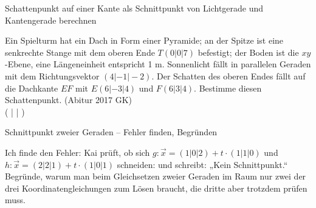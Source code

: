 \begin{aufgabe}{Schattenpunkt auf einer Kante als Schnittpunkt von Lichtgerade und Kantengerade berechnen}
\begin{teile}
\teil Ein Spielturm hat ein Dach in Form einer Pyramide; an der Spitze ist eine senkrechte Stange mit dem oberen Ende $T(0|0|7)$ befestigt; der Boden ist die $xy$-Ebene, eine Längeneinheit entspricht 1 m. Sonnenlicht fällt in parallelen Geraden mit dem Richtungsvektor $(4|-1|-2)$. Der Schatten des oberen Endes fällt auf die Dachkante $EF$ mit $E(6|-3|4)$ und $F(6|3|4)$. Bestimme diesen Schattenpunkt. \hfill (Abitur 2017 GK) \\ ( \leerfeld | \leerfeld | \leerfeld )
\end{teile}
\end{aufgabe}

\begin{aufgabe}{Schnittpunkt zweier Geraden – Fehler finden, Begründen}
\begin{teile}
\teil Ich finde den Fehler: Kai prüft, ob sich $g: \vec{x} = (1|0|2) + t \cdot (1|1|0)$ und $h: \vec{x} = (2|2|1) + t \cdot (1|0|1)$ schneiden:  und schreibt: „Kein Schnittpunkt.“
\teil Begründe, warum man beim Gleichsetzen zweier Geraden im Raum nur zwei der drei Koordinatengleichungen zum Lösen braucht, die dritte aber trotzdem prüfen muss.
\end{teile}
\end{aufgabe}
